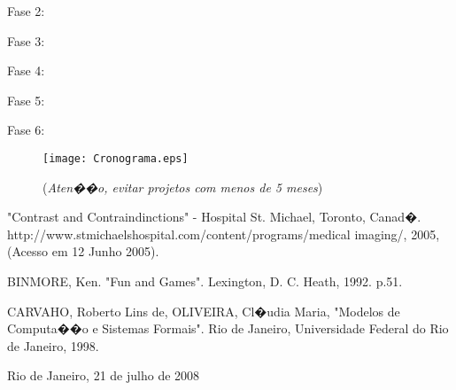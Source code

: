 \documentclass[a4paper,12pt,oneside,openany]{report}
\begin{document}
Fase 2: 

Fase 3: 

Fase 4: 

Fase 5: 

Fase 6: 

\begin{figure}
\begin{center}
\parbox[h]{14cm}
  {
  \begin{center}
  \texttt{[image: Cronograma.eps]}
  \caption[\small{(\textit{Aten��o, evitar projetos com menos de 5 meses})}]{\label{Fig:Cronograma} \footnotesize{(\textit{Aten��o, evitar projetos com menos de 5 meses})}}
  \end{center}
  }
\end{center}
\end{figure} 

\begin{thebibliography}{}

"Contrast and Contraindinctions" - Hospital St. Michael, Toronto, Canad�. http://www.stmichaelshospital.com/content/programs/medical imaging/, 2005, (Acesso em 12 Junho 2005).

BINMORE, Ken. "Fun and Games". Lexington, D. C. Heath, 1992. p.51.

CARVAHO, Roberto Lins de, OLIVEIRA, Cl�udia Maria, "Modelos de Computa��o e Sistemas Formais". Rio de Janeiro, Universidade Federal do Rio de Janeiro, 1998.

%
\end{thebibliography}

      \vspace{2cm}
      \noindent
Rio de Janeiro, 21 de julho de 2008

      \vspace{0.5cm}
      \begin{flushright}
         \parbox{10cm}{
            \hrulefill

            \vspace{-.375cm}

            \vspace{0.9cm}
            \hrulefill

            \vspace{-.375cm}
 
            \vspace{0.9cm}
         }
      \end{flushright}
      \vfill
      
\end{document}
